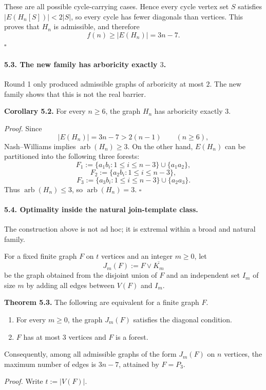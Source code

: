 These are all possible cycle-carrying cases. Hence every cycle vertex set $S$ satisfies $|E(H_n[S])|<2|S|$, so every cycle has fewer diagonals than vertices.
This proves that $H_n$ is admissible, and therefore
\[
f(n)\ge |E(H_n)|=3n-7.
\]
\hfill$\square$

\paragraph{5.3. The new family has arboricity exactly $3$.}
Round 1 only produced admissible graphs of arboricity at most $2$. The new family shows that this is not the real barrier.

\textbf{Corollary 5.2.}
For every $n\ge 6$, the graph $H_n$ has arboricity exactly $3$.

\textit{Proof.}
Since
\[
|E(H_n)|=3n-7>2(n-1)
\qquad (n\ge 6),
\]
Nash--Williams implies $\operatorname{arb}(H_n)\ge 3$.
On the other hand, $E(H_n)$ can be partitioned into the following three forests:
\[
F_1:=\{a_1b_i:1\le i\le n-3\}\cup\{a_1a_2\},
\]
\[
F_2:=\{a_2b_i:1\le i\le n-3\},
\]
\[
F_3:=\{a_3b_i:1\le i\le n-3\}\cup\{a_2a_3\}.
\]
Thus $\operatorname{arb}(H_n)\le 3$, so $\operatorname{arb}(H_n)=3$.
\hfill$\square$

\paragraph{5.4. Optimality inside the natural join-template class.}
The construction above is not ad hoc; it is extremal within a broad and natural family.

For a fixed finite graph $F$ on $t$ vertices and an integer $m\ge 0$, let
\[
J_m(F):=F\vee \overline{K_m}
\]
be the graph obtained from the disjoint union of $F$ and an independent set $I_m$ of size $m$ by adding all edges between $V(F)$ and $I_m$.

\textbf{Theorem 5.3.}
The following are equivalent for a finite graph $F$.

\begin{enumerate}
\item For every $m\ge 0$, the graph $J_m(F)$ satisfies the diagonal condition.
\item $F$ has at most $3$ vertices and $F$ is a forest.
\end{enumerate}

Consequently, among all admissible graphs of the form $J_m(F)$ on $n$ vertices, the maximum number of edges is $3n-7$, attained by $F=P_3$.

\textit{Proof.}
Write $t:=|V(F)|$.

